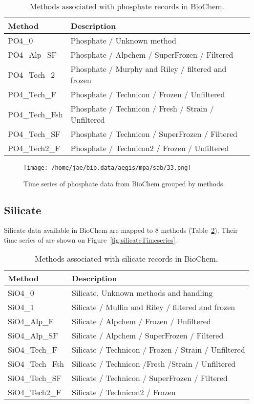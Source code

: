 \documentclass[letterpaper,portrait,11pt]{scrartcl}
\numberwithin{equation}{section}    %
\numberwithin{figure}{section}    %
\numberwithin{table}{section}       %
\begin{document}
\begin{appendices}
\begin{table}[h]
  \caption{Methods associated with phosphate records in BioChem.}
  \label{table:PhosphateMethods}
  \begin{tabular}{ll}
    Method & Description \\ \hline
    PO4\_0 & Phosphate / Unknown method  \\ 
    PO4\_Alp\_SF & Phosphate / Alpchem / SuperFrozen / Filtered \\ 
    PO4\_Tech\_2 & Phosphate / Murphy and Riley / filtered and frozen \\ 
    PO4\_Tech\_F & Phosphate / Technicon / Frozen / Unfiltered \\ 
    PO4\_Tech\_Fsh & Phosphate / Technicon / Fresh / Strain / Unfiltered \\
    PO4\_Tech\_SF & Phosphate / Technicon / SuperFrozen / Filtered \\
    PO4\_Tech2\_F & Phosphate / Technicon2 / Frozen / Unfiltered \\
  \end{tabular}
\end{table}


\begin{figure}[h]
  \centering
  \texttt{[image: /home/jae/bio.data/aegis/mpa/sab/33.png]}
  \caption{Time series of phosphate data from BioChem grouped by methods.}
  \label{fig:PhosphateTimeseries}
\end{figure}


\subsection{Silicate}

Silicate data available in BioChem are mapped to 8 methods (Table~\ref{table:SilicateMethods}). Their time series of are shown on Figure~\ref{fig:silicateTimeseries}.

\begin{table}[h]
  \label{table:SilicateMethods}
  \caption{Methods associated with silicate records in BioChem.}
  \begin{tabular}{ll}
    Method & Description \\ \hline
    SiO4\_0 & Silicate, Unknown methods and handling \\
    SiO4\_1 & Silicate / Mullin and Riley / filtered and frozen \\
    SiO4\_Alp\_F & Silicate / Alpchem / Frozen / Unfiltered \\
    SiO4\_Alp\_SF & Silicate / Alpchem / SuperFrozen / Filtered \\
    SiO4\_Tech\_F & Silicate / Technicon / Frozen / Strain / Unfiltered \\
    SiO4\_Tech\_Fsh & Silicate / Technicon /Fresh /Strain / Unfiltered \\
    SiO4\_Tech\_SF & Silicate / Technicon / SuperFrozen / Filtered \\
    SiO4\_Tech2\_F & Silicate / Technicon2 / Frozen \\
  \end{tabular}
\end{table}



\end{appendices}
\end{document}
